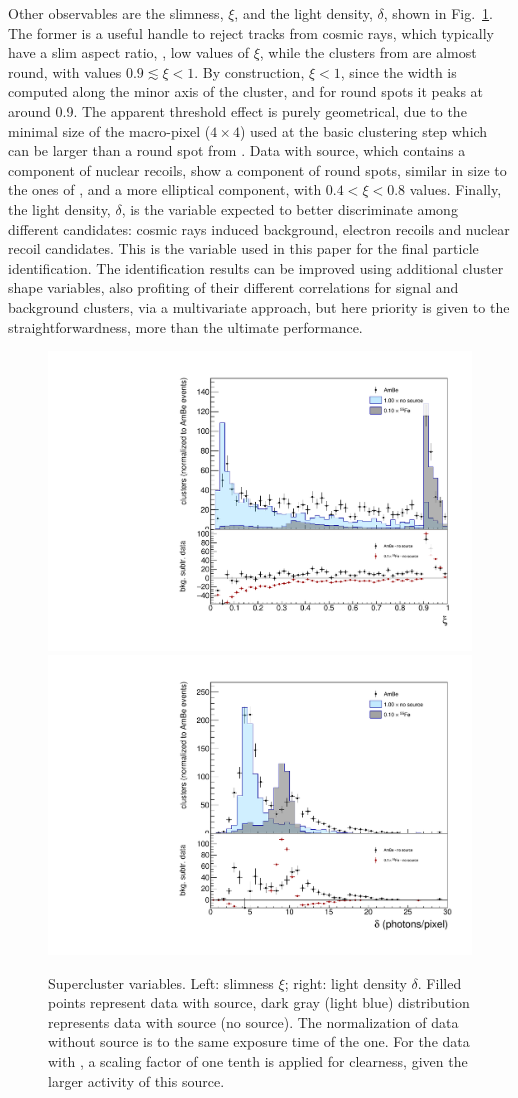 Other observables are the slimness, $\xi$, and the light density,
$\delta$, shown in Fig.~\ref{fig:clshape}. The former is a useful
handle to reject tracks from cosmic rays, which typically have a slim
aspect ratio, \ie, low values of $\xi$, while the clusters from \fe
are almost round, with values $0.9\lesssim\xi<1$. By construction,
$\xi<1$, since the width is computed along the minor axis of the
cluster, and for round spots it peaks at around 0.9. The apparent
threshold effect is purely geometrical, due to the minimal size of the
macro-pixel ($4{\times}4$) used at the basic clustering step which can
be larger than a round spot from \fe. Data with \ambe source, which
contains a component of nuclear recoils, show a component of round
spots, similar in size to the ones of \fe, and a more elliptical
component, with $0.4<\xi<0.8$ values. Finally, the light density,
$\delta$, is the variable expected to better discriminate among
different candidates: cosmic rays induced background, electron recoils
and nuclear recoil candidates. This is the variable used in this paper
for the final particle identification. The identification results can
be improved using additional cluster shape variables, also profiting
of their different correlations for signal and background clusters,
via a multivariate approach, but here priority is given to the
straightforwardness, more than the ultimate performance.

\begin{figure}[ht]
  \begin{center}
  \includegraphics[width=0.45\linewidth]{figures/slimness}
  \includegraphics[width=0.45\linewidth]{figures/density}

  \caption{Supercluster variables. Left: slimness $\xi$; right: light
    density $\delta$. Filled points represent data with \ambe source,
    dark gray (light blue) distribution represents data with \fe
    source (no source).  The normalization of data without source is
    to the same exposure time of the \ambe one. For the data with \fe,
    a scaling factor of one tenth is applied for clearness, given the
    larger activity of this source. \label{fig:clshape}}

\end{center}
\end{figure}

